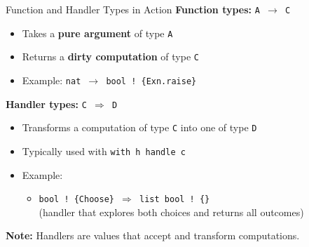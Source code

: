 \begin{frame}{Function and Handler Types in Action}
\textbf{Function types:} \texttt{A $\rightarrow$ C}
\begin{itemize}
  \item Takes a \textbf{pure argument} of type \texttt{A}
  \item Returns a \textbf{dirty computation} of type \texttt{C}
  \item Example: \texttt{nat $\rightarrow$ bool ! \{Exn.raise\}}
\end{itemize}

\vspace{1em}
\textbf{Handler types:} \texttt{C $\Rightarrow$ D}
\begin{itemize}
  \item Transforms a computation of type \texttt{C} into one of type \texttt{D}
  \item Typically used with \texttt{with h handle c}
  \item Example:
    \begin{itemize}
      \item \texttt{bool ! \{Choose\} $\Rightarrow$ list bool ! \{\}} \\
        (handler that explores both choices and returns all outcomes)
    \end{itemize}
\end{itemize}

\vspace{1em}
\textbf{Note:} Handlers are values that accept and transform computations.
\end{frame}

